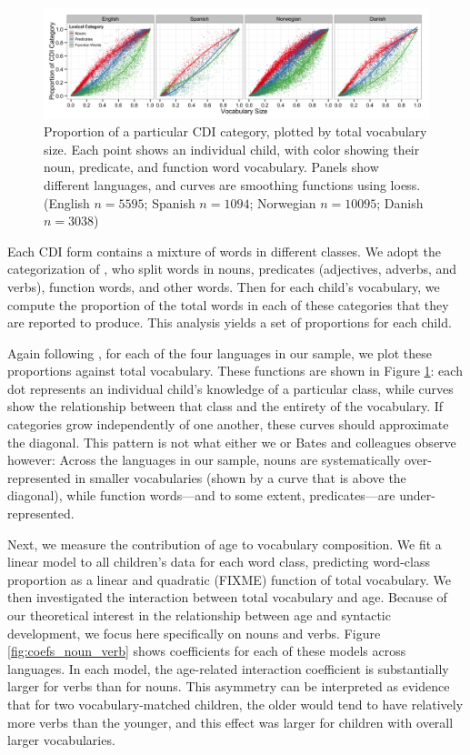 \documentclass[10pt,letterpaper]{article}
\begin{document}
\begin{figure}[tbh!]
\begin{center}
\includegraphics[width=\textwidth]{plots/composition.png}
\end{center}
\caption{\label{fig:vocab_comp} Proportion of a particular CDI category, plotted by total vocabulary size. Each point shows an individual child, with color showing their noun, predicate, and function word vocabulary. Panels show different languages, and curves are smoothing functions using loess. (English $n=5595$; Spanish $n=1094$; Norwegian $n=10095$; Danish $n=3038$)} 
\end{figure}

Each CDI form contains a mixture of words in different classes. We adopt the categorization of , who split words in nouns, predicates (adjectives, adverbs, and verbs), function words, and other words. Then for each child's vocabulary, we compute the proportion of the total words in each of these categories that they are reported to produce. This analysis yields a set of proportions for each child.

Again following , for each of the four languages in our sample, we plot these proportions against total vocabulary. These functions are shown in Figure \ref{fig:vocab_comp}: each dot represents an individual child's knowledge of a particular class, while curves show the relationship between that class and the entirety of the vocabulary. If categories grow independently of one another, these curves should approximate the diagonal. This pattern is not what either we or Bates and colleagues observe however: Across the languages in our sample, nouns are systematically over-represented in smaller vocabularies (shown by a curve that is above the diagonal), while function words---and to some extent, predicates---are under-represented. 

Next, we measure the contribution of age to vocabulary composition. We fit a linear model to all children's data for each word class, predicting word-class proportion as a linear and quadratic (FIXME) function of total vocabulary. We then investigated the interaction between total vocabulary and age. Because of our theoretical interest in the relationship between age and syntactic development, we focus here specifically on nouns and verbs. Figure \ref{fig:coefs_noun_verb} shows coefficients for each of these models across languages. In each model, the age-related interaction coefficient is substantially larger for verbs than for nouns. This asymmetry can be interpreted as evidence that for two vocabulary-matched children, the older would tend to have relatively more verbs than the younger, and this effect was larger for children with overall larger vocabularies.
\end{document}
